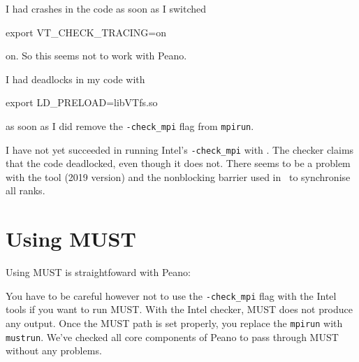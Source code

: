 \begin{remark}
 I had crashes in the code as soon as I switched
 \begin{code}
 export VT_CHECK_TRACING=on
 \end{code}
 on. So this seems not to work with Peano.
\end{remark}



\begin{remark}
 I had deadlocks in my code with
 \begin{code}
 export LD_PRELOAD=libVTfs.so
 \end{code}
 as soon as I did remove the \texttt{-check\_mpi} flag from \texttt{mpirun}.
\end{remark}



\begin{remark}
 I have not yet succeeded in running Intel's \texttt{-check\_mpi} with \ExaHyPE.
 The checker claims that the code deadlocked, even though it does not. There
 seems to be a problem with the tool (2019 version) and the nonblocking barrier
 used in \ExaHyPE\ to synchronise all ranks.
\end{remark}


\section{Using MUST}
\label{section:supercomputers:MUST}

Using MUST is straightfoward with Peano:


\noindent
You have to be careful however not to use the \texttt{-check\_mpi} flag with the
Intel tools if you want to run MUST.
With the Intel checker, MUST does not produce any output.
Once the MUST path is set properly, you replace the \texttt{mpirun} with
\texttt{mustrun}.
We've checked all core components of Peano to pass through MUST without any
problems.


% 
% 

